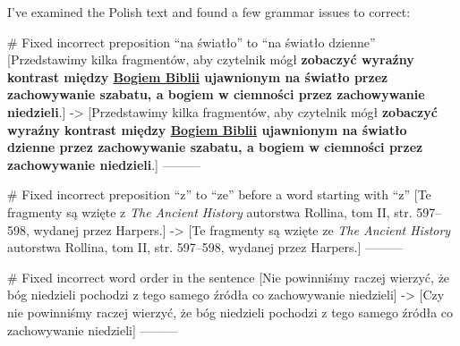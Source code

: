I've examined the Polish text and found a few grammar issues to correct:

# Fixed incorrect preposition “na światło” to “na światło dzienne”
[Przedstawimy kilka fragmentów, aby czytelnik mógł \textbf{zobaczyć wyraźny kontrast między \underline{Bogiem Biblii} ujawnionym na światło przez zachowywanie szabatu, a bogiem w ciemności przez zachowywanie niedzieli}.]
->
[Przedstawimy kilka fragmentów, aby czytelnik mógł \textbf{zobaczyć wyraźny kontrast między \underline{Bogiem Biblii} ujawnionym na światło dzienne przez zachowywanie szabatu, a bogiem w ciemności przez zachowywanie niedzieli}.]
---------

# Fixed incorrect preposition “z” to “ze” before a word starting with “z”
[Te fragmenty są wzięte z \textit{The Ancient History} autorstwa Rollina, tom II, str. 597--598, wydanej przez Harpers.]
->
[Te fragmenty są wzięte ze \textit{The Ancient History} autorstwa Rollina, tom II, str. 597--598, wydanej przez Harpers.]
---------

# Fixed incorrect word order in the sentence
[Nie powinniśmy raczej wierzyć, że bóg niedzieli pochodzi z tego samego źródła co zachowywanie niedzieli]
->
[Czy nie powinniśmy raczej wierzyć, że bóg niedzieli pochodzi z tego samego źródła co zachowywanie niedzieli]
---------